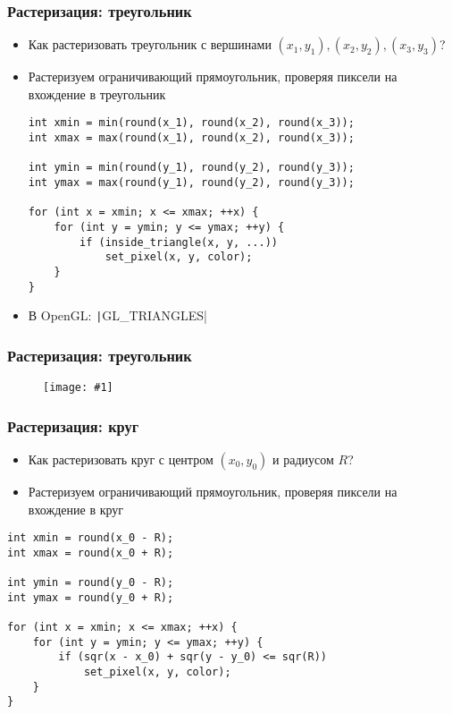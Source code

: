 \documentclass[10pt]{beamer}
\newcommand{\slideimage}[1]{
  \begin{figure}
    \begin{adjustbox}{width=\textwidth, totalheight=\textheight-2\baselineskip-2\baselineskip,keepaspectratio}
      \texttt{[image: \#1]}
    \end{adjustbox}
  \end{figure}
}
\begin{document}
\begin{frame}[fragile]
\frametitle{Растеризация: треугольник}
\begin{itemize}
\item Как растеризовать треугольник с вершинами \begin{math}(x_1, y_1), (x_2, y_2), (x_3, y_3)\end{math}?
\pause
\item Растеризуем ограничивающий прямоугольник, проверяя пиксели на вхождение в треугольник
\pause
{}
\begin{verbatim}
int xmin = min(round(x_1), round(x_2), round(x_3));
int xmax = max(round(x_1), round(x_2), round(x_3));

int ymin = min(round(y_1), round(y_2), round(y_3));
int ymax = max(round(y_1), round(y_2), round(y_3));

for (int x = xmin; x <= xmax; ++x) {
    for (int y = ymin; y <= ymax; ++y) {
        if (inside_triangle(x, y, ...))
            set_pixel(x, y, color);
    }
}
\end{verbatim}
\pause
{}
\item В OpenGL: \texttt|GL_TRIANGLES|
\end{itemize}
\end{frame}

\begin{frame}
\frametitle{Растеризация: треугольник}
\slideimage{raster-triangle.png}
\end{frame}

\begin{frame}[fragile]
\frametitle{Растеризация: круг}
\begin{itemize}
\item Как растеризовать круг с центром \begin{math}(x_0, y_0)\end{math} и радиусом \begin{math}R\end{math}?
\pause
\item Растеризуем ограничивающий прямоугольник, проверяя пиксели на вхождение в круг
\end{itemize}
\pause
{}
\begin{verbatim}
int xmin = round(x_0 - R);
int xmax = round(x_0 + R);

int ymin = round(y_0 - R);
int ymax = round(y_0 + R);

for (int x = xmin; x <= xmax; ++x) {
    for (int y = ymin; y <= ymax; ++y) {
        if (sqr(x - x_0) + sqr(y - y_0) <= sqr(R))
            set_pixel(x, y, color);
    }
}
\end{verbatim}
\end{frame}
\end{document}
